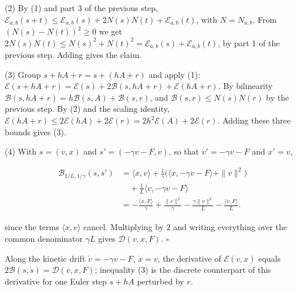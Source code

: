 \documentclass[11pt,a4paper]{article}
\begin{document}
(2) By (1) and part 3 of the previous step, \(\mathcal E_{a,b}(s+t)\le\mathcal E_{a,b}(s)+2N(s)N(t)+\mathcal E_{a,b}(t)\), with \(N=N_{a,b}\). From \((N(s)-N(t))^2\ge0\) we get \(2N(s)N(t)\le N(s)^2+N(t)^2=\mathcal E_{a,b}(s)+\mathcal E_{a,b}(t)\), by part 1 of the previous step. Adding gives the claim.




(3) Group \(s+hA+r=s+(hA+r)\) and apply (1): \(\mathcal E(s+hA+r)=\mathcal E(s)+2\mathcal B(s,hA+r)+\mathcal E(hA+r)\). By bilinearity \(\mathcal B(s,hA+r)=h\mathcal B(s,A)+\mathcal B(s,r)\), and \(\mathcal B(s,r)\le N(s)N(r)\) by the previous step. By (2) and the scaling identity, \(\mathcal E(hA+r)\le2\mathcal E(hA)+2\mathcal E(r)=2h^2\mathcal E(A)+2\mathcal E(r)\). Adding these three bounds gives (3).




(4) With \(s=(v,x)\) and \(s'=(-\gamma v-F,v)\), so that \(v'=-\gamma v-F\) and \(x'=v\),


\[\begin{aligned}
\mathcal B_{1/L,1/\gamma}(s,s')&=\langle x,v\rangle
 +\frac1\gamma\bigl(\langle x,-\gamma v-F\rangle+\|v\|^2\bigr)\\
&\quad+\frac1L\langle v,-\gamma v-F\rangle\\
&=-\frac{\langle x,F\rangle}{\gamma}+\frac{\|v\|^2}{\gamma}
 -\frac{\gamma\|v\|^2}{L}-\frac{\langle v,F\rangle}{L}.
\end{aligned}\]


since the terms \(\langle x,v\rangle\) cancel. Multiplying by \(2\) and writing everything over the common denominator \(\gamma L\) gives \(\mathcal D(v,x,F)\). \(\square\)




Along the kinetic drift \(\dot v=-\gamma v-F\), \(\dot x=v\), the derivative of \(\mathcal E(v,x)\) equals \(2\mathcal B(s,\dot s)=\mathcal D(v,x,F)\); inequality (3) is the discrete counterpart of this derivative for one Euler step \(s+hA\) perturbed by \(r\).
\end{document}

